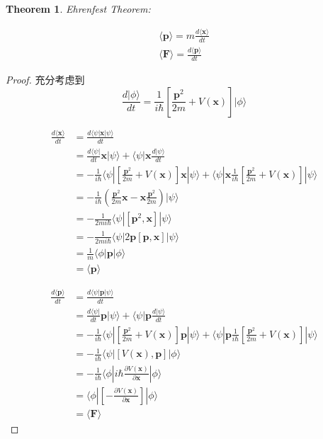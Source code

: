 \documentclass{article}
\newtheorem{theorem}{Theorem}[section]
\newtheorem{proof}{Proof}[section]
\numberwithin{equation}{section}
\newcommand{\bra}[1]{\langle #1 |}
\newcommand{\ket}[1]{| #1 \rangle}
\newcommand{\bracketl}[3]{\langle #1 | #2 | #3 \rangle}
\newcommand{\mean}[1]{\langle #1 \rangle}
\begin{document}
\begin{theorem}
Ehrenfest Theorem:

\begin{align}
\mean{\textbf{p}}= m \frac{d \mean{\textbf{x}}}{dt}\\
\mean{\textbf{F}}= \frac{d\mean{\textbf{p}}}{dt}
\end{align}
\end{theorem}

\begin{proof}
  充分考虑到
  \begin{equation}
  \frac{d\ket{\phi}}{dt}=\frac{1}{i\hbar}[\frac{\textbf{p}^2}{2m}+V(\textbf{x})]\ket{\phi}
  \end{equation}

  \begin{align*}
  \frac{d \mean{\textbf{x}}}{dt}  & = \frac{d \bracketl{\psi}{\textbf{x}}{\psi}}{dt} \\ 
  & = \frac{d\bra{\psi}}{dt} \textbf{x} \ket{\psi} + \bra{\psi} \textbf{x} \frac{d\ket{\psi}}{dt} \\
  &= - \frac{1}{i \hbar}\bra{\psi}[\frac{\textbf{p}^2}{2m}+V(\textbf{x})]\textbf{x}\ket{\psi}+ \bra{\psi}\textbf{x}\frac{1}{i\hbar}[\frac{\textbf{p}^2}{2m}+V(\textbf{x})]\ket{\psi}\\
  &= -\frac{1}{i\hbar}(\frac{\textbf{p}^2}{2m}\textbf{x}-\textbf{x}\frac{\textbf{p}^2}{2m})\ket{\psi}\\
  &= -\frac{1}{2mi\hbar}\bracketl{\psi}{[\textbf{p}^2,\textbf{x}]}{\psi}\\
  &=-\frac{1}{2mi\hbar}\bracketl{\psi}{2\textbf{p}[\textbf{p},\textbf{x}]}{\psi}\\
  &=\frac{1}{m}\bracketl{\phi}{\textbf{p}}{\phi}\\
  &=\mean{\textbf{p}}
  \end{align*}

  \begin{align*}
  \frac{d\mean{\textbf{p}}}{dt} &= \frac{d\bracketl{\psi}{\textbf{p}}{\psi}}{dt}\\
  &=\frac{d\bra{\psi}}{dt} \textbf{p} \ket{\psi} + \bra{\psi} \textbf{p} \frac{d\ket{\psi}}{dt} \\
  &= - \frac{1}{i \hbar}\bra{\psi}[\frac{\textbf{p}^2}{2m}+V(\textbf{x})]\textbf{p}\ket{\psi}+ \bra{\psi}\textbf{p}\frac{1}{i\hbar}[\frac{\textbf{p}^2}{2m}+V(\textbf{x})]\ket{\psi}\\
  &= -\frac{1}{i\hbar}\bracketl{\psi}{[V(\textbf{x}),\textbf{p}]}{\phi} \\
  & = -\frac{1}{i\hbar}\bracketl{\phi}{i\hbar\frac{\partial V(\textbf{x})}{\partial \textbf{x}}}{\phi}\\
  & = \bracketl{\phi}{[-\frac{\partial V(\textbf{x})}{\partial \textbf{x}}]}{\phi}\\
  & = \mean{\textbf{F}}
  \end{align*}


\end{proof}
\end{document}
